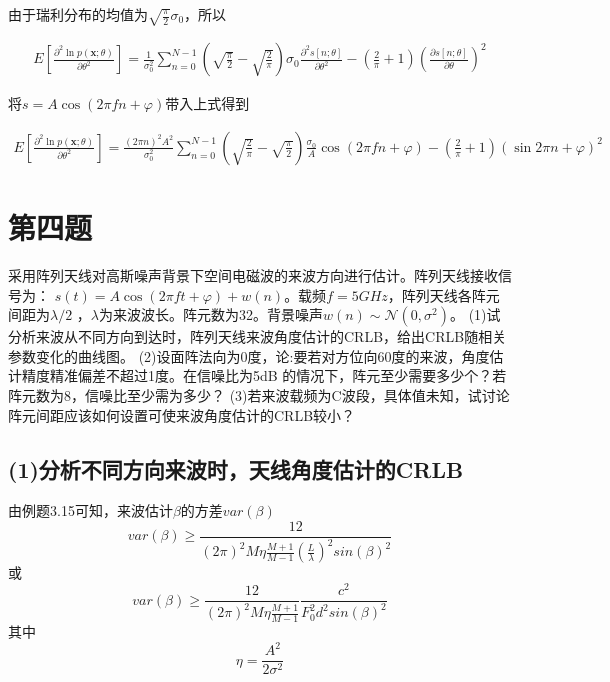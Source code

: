 \documentclass[fontset=windows]{article}
\numberwithin{figure}{section}
\begin{document}
由于瑞利分布的均值为\(\sqrt{\frac{\pi}{2}}\sigma_0\)，所以

\begin{align*}
	E\left[\frac{\partial^2 \ln p(\mathbf{x};\theta)}{\partial \theta^2}\right]
	=\frac{1}{\sigma_0^2}\sum_{n=0}^{N-1}(\sqrt{\frac{\pi}{2}}-\sqrt{\frac{2}{\pi}})\sigma_0
	\frac{\partial^2 s[n;\theta]}{\partial \theta^2}
	-(\frac{2}{\pi}+1)\left(\frac{\partial s[n;\theta]}{\partial \theta}\right)^2
\end{align*}

将\(s=A\cos (2\pi fn+\varphi)\)带入上式得到

\begin{align*}
	E\left[\frac{\partial^2 \ln p(\mathbf{x};\theta)}{\partial \theta^2}\right]
	=\frac{(2\pi n)^2A^2}{\sigma_0^2}\sum_{n=0}^{N-1}(\sqrt{\frac{2}{\pi}}-
	\sqrt{\frac{\pi}{2}})\frac{\sigma_0}{A}\cos (2\pi fn+\varphi)
	-(\frac{2}{\pi}+1)(\sin 2\pi n+\varphi)^2
\end{align*}


\section{第四题}
采用阵列天线对高斯噪声背景下空间电磁波的来波方向进行估计。阵列天线接收信号为：
\(s(t)=A\cos (2\pi ft+\varphi)+w(n)\)。载频\(f=5GHz\)，阵列天线各阵元间距为\(\lambda/2\)
，\(\lambda\)为来波波长。阵元数为32。背景噪声\(w(n)\sim \mathcal{N} (0,\sigma^2)\)。
(1)试分析来波从不同方向到达时，阵列天线来波角度估计的CRLB，给出CRLB随相关参数变化的曲线图。
(2)设面阵法向为0度，论:要若对方位向60度的来波，角度估计精度精准偏差不超过1度。在信噪比为5dB
的情况下，阵元至少需要多少个？若阵元数为8，信噪比至少需为多少？
(3)若来波载频为C波段，具体值未知，试讨论阵元间距应该如何设置可使来波角度估计的CRLB较小？

\subsection*{(1)分析不同方向来波时，天线角度估计的CRLB}
由例题3.15可知，来波估计$\beta$的方差$var(\beta)$
\begin{equation}
	var(\beta) \geq \frac{12}{(2\pi)^{2}M\eta\frac{M+1}{M-1}(\frac{L}{\lambda})^{2}sin(\beta)^{2}}
	\tag{4.1}
\end{equation}
或
\begin{equation}
	var(\beta) \geq \frac{12}{(2\pi)^{2}M\eta\frac{M+1}{M-1}}\frac{c^2}{F_0^2d^2sin(\beta)^2} \tag{4.2}
\end{equation}
其中$$\eta=\frac{A^{2}}{2\sigma^{2}}$$
\end{document}
